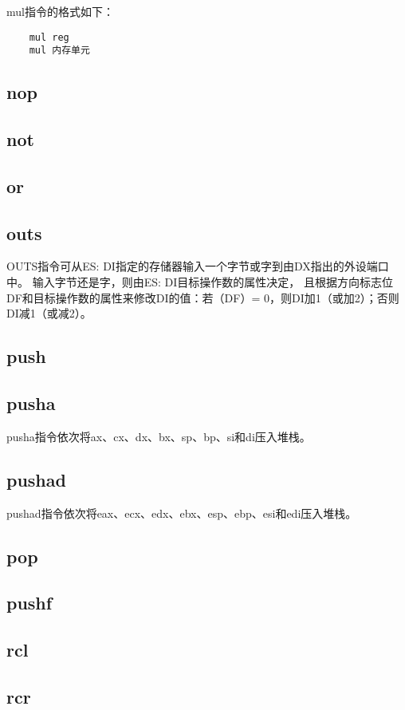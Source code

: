 \documentclass[a4paper,left=2.5cm,right=2.5cm,11pt]{article}
\begin{document}
	mul指令的格式如下：
	\begin{lstlisting}
	mul reg
	mul 内存单元
	\end{lstlisting}
	
\subsection{nop}
\subsection{not}
\subsection{or}
\subsection{outs}
	OUTS指令可从ES: DI指定的存储器输入一个字节或字到由DX指出的外设端口中。
	输入字节还是字，则由ES: DI目标操作数的属性决定，
	且根据方向标志位DF和目标操作数的属性来修改DI的值：若（DF）= 0，则DI加1（或加2）；否则DI减1（或减2）。 

\subsection{push}
\subsection{pusha}
	pusha指令依次将ax、cx、dx、bx、sp、bp、si和di压入堆栈。

\subsection{pushad}
	pushad指令依次将eax、ecx、edx、ebx、esp、ebp、esi和edi压入堆栈。

\subsection{pop}
\subsection{pushf}
\subsection{rcl}
\subsection{rcr}
\end{document}
